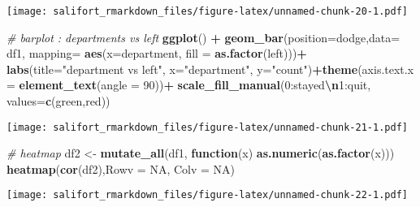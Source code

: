 \documentclass[
]{article}
\newenvironment{Shaded}{\begin{snugshade}}{\end{snugshade}}
\newcommand{\AttributeTok}[1]{\textcolor[rgb]{0.13,0.29,0.53}{#1}}
\newcommand{\CommentTok}[1]{\textcolor[rgb]{0.56,0.35,0.01}{\textit{#1}}}
\newcommand{\ConstantTok}[1]{\textcolor[rgb]{0.56,0.35,0.01}{#1}}
\newcommand{\ControlFlowTok}[1]{\textcolor[rgb]{0.13,0.29,0.53}{\textbf{#1}}}
\newcommand{\DecValTok}[1]{\textcolor[rgb]{0.00,0.00,0.81}{#1}}
\newcommand{\FunctionTok}[1]{\textcolor[rgb]{0.13,0.29,0.53}{\textbf{#1}}}
\newcommand{\NormalTok}[1]{#1}
\newcommand{\OtherTok}[1]{\textcolor[rgb]{0.56,0.35,0.01}{#1}}
\newcommand{\SpecialCharTok}[1]{\textcolor[rgb]{0.81,0.36,0.00}{\textbf{#1}}}
\newcommand{\StringTok}[1]{\textcolor[rgb]{0.31,0.60,0.02}{#1}}
\begin{document}
\texttt{[image: salifort\_rmarkdown\_files/figure-latex/unnamed-chunk-20-1.pdf]}

\begin{Shaded}
\begin{Highlighting}[]
\CommentTok{\# barplot : departments vs left}
\FunctionTok{ggplot}\NormalTok{() }\SpecialCharTok{+} \FunctionTok{geom\_bar}\NormalTok{(}\AttributeTok{position=}\StringTok{\textquotesingle{}dodge\textquotesingle{}}\NormalTok{,}\AttributeTok{data=}\NormalTok{ df1, }\AttributeTok{mapping=} \FunctionTok{aes}\NormalTok{(}\AttributeTok{x=}\NormalTok{department, }\AttributeTok{fill =} \FunctionTok{as.factor}\NormalTok{(left)))}\SpecialCharTok{+}
  \FunctionTok{labs}\NormalTok{(}\AttributeTok{title=}\StringTok{"department vs left"}\NormalTok{, }\AttributeTok{x=}\StringTok{"department"}\NormalTok{, }\AttributeTok{y=}\StringTok{"count"}\NormalTok{)}\SpecialCharTok{+}\FunctionTok{theme}\NormalTok{(}\AttributeTok{axis.text.x =} \FunctionTok{element\_text}\NormalTok{(}\AttributeTok{angle =} \DecValTok{90}\NormalTok{))}\SpecialCharTok{+}
  \FunctionTok{scale\_fill\_manual}\NormalTok{(}\StringTok{\textquotesingle{}0:stayed}\SpecialCharTok{\textbackslash{}n}\StringTok{1:quit\textquotesingle{}}\NormalTok{, }\AttributeTok{values=}\FunctionTok{c}\NormalTok{(}\StringTok{\textquotesingle{}green\textquotesingle{}}\NormalTok{,}\StringTok{\textquotesingle{}red\textquotesingle{}}\NormalTok{))}
\end{Highlighting}
\end{Shaded}

\texttt{[image: salifort\_rmarkdown\_files/figure-latex/unnamed-chunk-21-1.pdf]}

\begin{Shaded}
\begin{Highlighting}[]
\CommentTok{\# heatmap}
\NormalTok{df2 }\OtherTok{\textless{}{-}} \FunctionTok{mutate\_all}\NormalTok{(df1, }\ControlFlowTok{function}\NormalTok{(x) }\FunctionTok{as.numeric}\NormalTok{(}\FunctionTok{as.factor}\NormalTok{(x)))}
\FunctionTok{heatmap}\NormalTok{(}\FunctionTok{cor}\NormalTok{(df2),}\AttributeTok{Rowv =} \ConstantTok{NA}\NormalTok{, }\AttributeTok{Colv =} \ConstantTok{NA}\NormalTok{)}
\end{Highlighting}
\end{Shaded}

\texttt{[image: salifort\_rmarkdown\_files/figure-latex/unnamed-chunk-22-1.pdf]}
\end{document}
